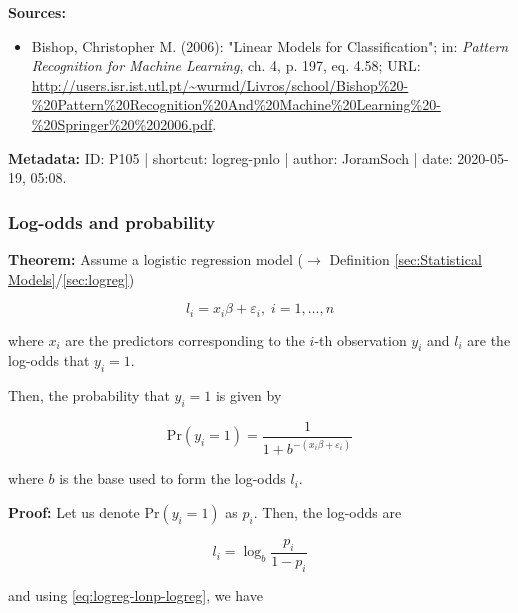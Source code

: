 \documentclass[a4paper,12pt,twoside]{book}
\begin{document}
\vspace{1em}
\textbf{Sources:}
\begin{itemize}
\item Bishop, Christopher M. (2006): "Linear Models for Classification"; in: \textit{Pattern Recognition for Machine Learning}, ch. 4, p. 197, eq. 4.58; URL: \url{http://users.isr.ist.utl.pt/~wurmd/Livros/school/Bishop%20-%20Pattern%20Recognition%20And%20Machine%20Learning%20-%20Springer%20%202006.pdf}.
\end{itemize}


\vspace{1em}
\textbf{Metadata:} ID: P105 | shortcut: logreg-pnlo | author: JoramSoch | date: 2020-05-19, 05:08.
\vspace{1em}



\subsubsection[\textbf{Log-odds and probability}]{Log-odds and probability} \label{sec:logreg-lonp}
\setcounter{equation}{0}

\textbf{Theorem:} Assume a logistic regression model ($\rightarrow$ Definition \ref{sec:Statistical Models}/\ref{sec:logreg})

\begin{equation} \label{eq:logreg-lonp-logreg}
l_i = x_i \beta + \varepsilon_i, \; i = 1,\ldots,n
\end{equation}

where $x_i$ are the predictors corresponding to the $i$-th observation $y_i$ and $l_i$ are the log-odds that $y_i = 1$.

Then, the probability that $y_i = 1$ is given by

\begin{equation} \label{eq:logreg-lonp-prob}
\mathrm{Pr}(y_i = 1) = \frac{1}{1 + b^{-(x_i \beta + \varepsilon_i)}}
\end{equation}

where $b$ is the base used to form the log-odds $l_i$.


\vspace{1em}
\textbf{Proof:} Let us denote $\mathrm{Pr}(y_i = 1)$ as $p_i$. Then, the log-odds are

\begin{equation} \label{eq:logreg-lonp-lodds}
l_i = \log_b \frac{p_i}{1-p_i}
\end{equation}

and using \eqref{eq:logreg-lonp-logreg}, we have
\end{document}
